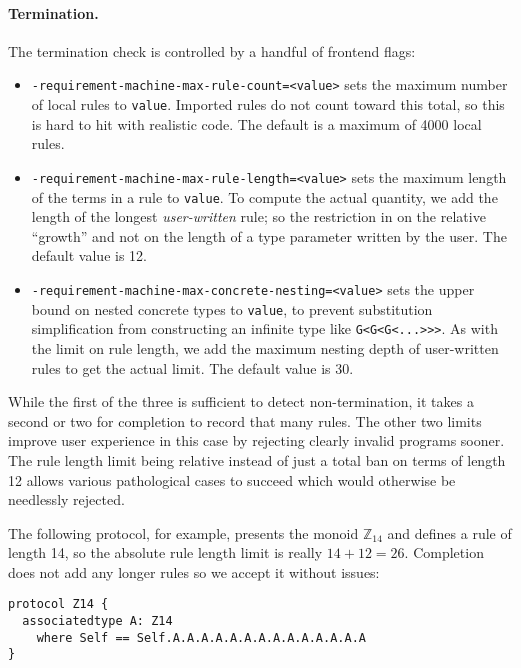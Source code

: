 \documentclass[../generics]{subfiles}
\begin{document}
\paragraph{Termination.} The termination check is controlled by a handful of frontend flags:
\begin{itemize}
\item {} \texttt{-requirement-machine-max-rule-count=<value>} sets the maximum number of local rules to \texttt{value}. Imported rules do not count toward this total, so this is hard to hit with realistic code. The default is a maximum of 4000 local rules.

\item {} \texttt{-requirement-machine-max-rule-length=<value>} sets the maximum length of the terms in a rule to \texttt{value}. To compute the actual quantity, we add the length of the longest \emph{user-written} rule; so the restriction in on the relative ``growth'' and not on the length of a type parameter written by the user. The default value is 12.

\item {} \texttt{-requirement-machine-max-concrete-nesting=<value>} sets the upper bound on nested concrete types to \texttt{value}, to prevent substitution simplification from constructing an infinite type like \texttt{G<G<G<...>>>}. As with the limit on rule length, we add the maximum nesting depth of user-written rules to get the actual limit. The default value is 30.
\end{itemize}

While the first of the three is sufficient to detect non-termination, it takes a second or two for completion to record that many rules. The other two limits improve user experience in this case by rejecting clearly invalid programs sooner. The rule length limit being relative instead of just a total ban on terms of length 12 allows various pathological cases to succeed which would otherwise be needlessly rejected.

The following protocol, for example, presents the monoid $\mathbb{Z}_{14}$ and defines a rule of length 14, so the absolute rule length limit is really $14+12=26$. Completion does not add any longer rules so we accept it without issues:
\begin{Verbatim}
protocol Z14 {
  associatedtype A: Z14
    where Self == Self.A.A.A.A.A.A.A.A.A.A.A.A.A.A
}
\end{Verbatim}
\end{document}
